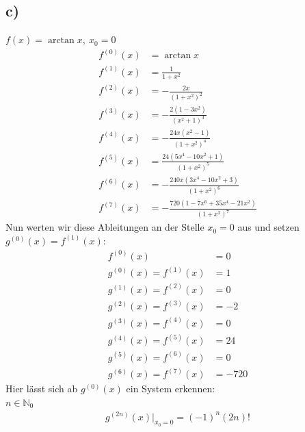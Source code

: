 \documentclass{theozettel}
\begin{document}
\subsection*{c)}$f\left(x\right)=\arctan x, \ x_0=0$
\begin{align*}
f^{\left(0\right)}\left(x\right)&=\arctan x\\
f^{\left(1\right)}\left(x\right) &= \frac{1}{1+x^2}\\
f^{\left(2\right)}\left(x\right)&=-\frac{2x}{\left(1+x^2\right)^2}\\
f^{\left(3\right)}\left(x\right)&=-\frac{2\left(1-3x^2\right)}{\left(x^2+1\right)^3}\\
f^{\left(4\right)}\left(x\right)&= -\frac{24x\left(x^2-1\right)}{\left(1+x^2\right)^4}\\
f^{\left(5\right)}\left(x\right)&=\frac{24\left(5x^4-10x^2+1\right)}{\left(1+x^2\right)^5}\\
f^{\left(6\right)}\left(x\right)&=-\frac{240x\left(3x^4-10x^2+3\right)}{\left(1+x^2\right)^6}\\
f^{\left(7\right)}\left(x\right)&=-\frac{720\left(1-7x^6+35x^4-21x^2\right)}{\left(1+x^2\right)^7}
\end{align*}
Nun werten wir diese Ableitungen an der Stelle $x_0=0$ aus und setzen $g^{\left(0\right)}\left(x\right)=f^{\left(1\right)}\left(x\right)$:
\begin{align*}
f^{\left(0\right)}\left(x\right)&=0\\
g^{\left(0\right)}\left(x\right)=f^{\left(1\right)}\left(x\right)&= 1\\
g^{\left(1\right)}\left(x\right)=f^{\left(2\right)}\left(x\right)&=0\\
g^{\left(2\right)}\left(x\right)=f^{\left(3\right)}\left(x\right)&=-2\\
g^{\left(3\right)}\left(x\right)=f^{\left(4\right)}\left(x\right)&= 0\\
g^{\left(4\right)}\left(x\right)=f^{\left(5\right)}\left(x\right)&=24\\
g^{\left(5\right)}\left(x\right)=f^{\left(6\right)}\left(x\right)&=0\\
g^{\left(6\right)}\left(x\right)=f^{\left(7\right)}\left(x\right)&=-720
\end{align*}
Hier lässt sich ab $g^{\left(0\right)}\left(x\right)$ ein System erkennen:\\
$n\in\mathbb{N}_0$
\begin{align*}
g^{\left(2n\right)}\left(x\right)\big|_{x_0=0}=\left(-1\right)^n\left(2n\right)!
\end{align*}
\end{document}
